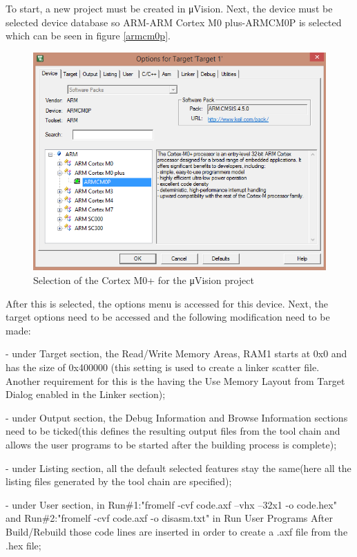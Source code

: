 To start, a new project must be created in μVision. Next, the device must be selected device database so ARM-ARM Cortex M0 plus-ARMCM0P is selected which can be seen in figure \ref{armcm0p}.
\begin{figure}
\centering
\includegraphics[scale=0.7]{figures/armcm0p.PNG}
\caption{Selection of the Cortex M0+ for the μVision project} 
\label{fig:armcm0p}
\end{figure}

After this is selected, the options menu is accessed for this device. Next, the target options need to be accessed and the following modification need to be made:

- under Target section, the Read/Write Memory Areas, RAM1 starts at 0x0 and has the size of 0x400000 (this setting is used to create a linker scatter file. Another requirement for this is the having the Use Memory Layout from Target Dialog enabled in the Linker section);

- under Output section, the Debug Information and Browse Information sections need to be ticked(this defines the resulting output files from the tool chain and allows the user programs to be started after the building process is complete);

- under Listing section, all the default selected features stay the same(here all the listing files generated by the tool chain are specified);

- under User section, in Run\#1:"fromelf -cvf code.axf --vhx --32x1 -o code.hex" and Run\#2:"fromelf -cvf code.axf -o disasm.txt" in Run User Programs After Build/Rebuild those code lines are inserted in order to create a .axf file from the .hex file;


